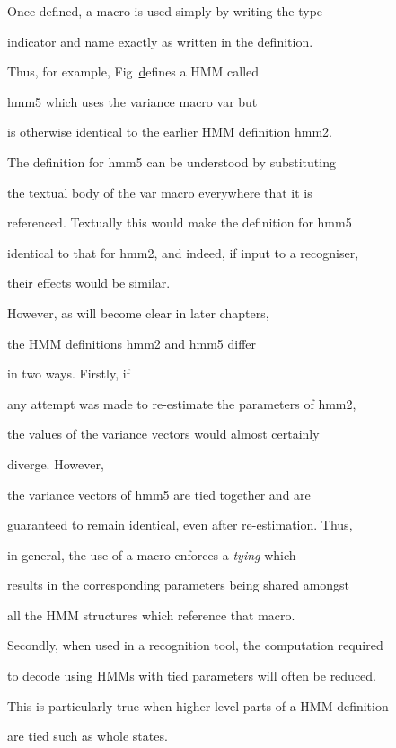 Once defined,  a macro is used simply by writing the type


indicator and name exactly as written in the definition.


Thus, for example, Fig~\href{f:hmm5def} defines a HMM called


\textsf{hmm5} which uses the variance macro  \textsf{var} but


is otherwise identical to the earlier HMM definition \textsf{hmm2}.







The definition for \textsf{hmm5} can be understood by substituting


the textual body of the \textsf{var} macro everywhere that it is


referenced.  Textually this would make the definition for \textsf{hmm5}


identical to that for \textsf{hmm2}, and indeed, if input to a recogniser,


their effects would be similar.  


However, as will become clear in later chapters,


the HMM definitions \textsf{hmm2} and  \textsf{hmm5} differ


in two ways.  Firstly,  if


any attempt was made to re-estimate the parameters of \textsf{hmm2},


the values of the variance vectors would almost certainly


diverge.  However,


the variance vectors of \textsf{hmm5} are tied together and are


guaranteed to remain identical, even after re-estimation.  Thus,


in general, the use of a macro enforces a \textit{tying} which


results in the corresponding parameters being shared amongst


all the HMM structures which reference that macro.


Secondly, when used in a recognition tool, the computation required


to decode using HMMs with tied parameters will often be reduced.


This is particularly true when higher level parts of a HMM definition


are tied such as whole states.





